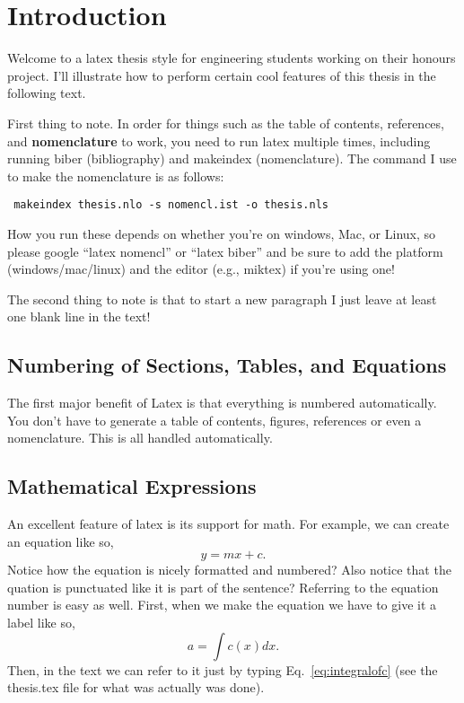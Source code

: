 \documentclass[12pt, BEng]{UoAThesis}
\begin{document}
\chapter{Introduction}
Welcome to a latex thesis style for engineering students working on
their honours project. I'll illustrate how to perform certain cool
features of this thesis in the following text.

First thing to note. In order for things such as the table of
contents, references, and {\bf nomenclature} to work, you need to run
latex multiple times, including running biber (bibliography)
and makeindex (nomenclature). The command I use to make the
nomenclature is as follows:

{\tt
  makeindex thesis.nlo -s nomencl.ist -o thesis.nls
}

How you run these depends on whether you're on windows, Mac, or Linux,
so please google ``latex nomencl'' or ``latex biber'' and be sure to
add the platform (windows/mac/linux) and the editor (e.g., miktex) if
you're using one!

The second thing to note is that to start a new paragraph I just
leave at least one blank line in the text!

\section{Numbering of Sections, Tables, and Equations}
The first major benefit of Latex is that everything is numbered
automatically. You don't have to generate a table of contents,
figures, references or even a nomenclature. This is all handled
automatically.

\section{\label{sec:math} Mathematical Expressions}
An excellent feature of latex is its support for math. For example, we
can create an equation like so,
\begin{equation}
  y = mx+c.
\end{equation}
Notice how the equation is nicely formatted and numbered? Also notice
that the quation is punctuated like it is part of the sentence?
Referring to the equation number is easy as well. First, when we make
the equation we have to give it a label like so,
\begin{equation}\label{eq:integralofc}
  a = \int c(x)dx.
\end{equation}
Then, in the text we can refer to it just by typing
Eq.~\ref{eq:integralofc} (see the thesis.tex file for what was
actually was done).
\end{document}
